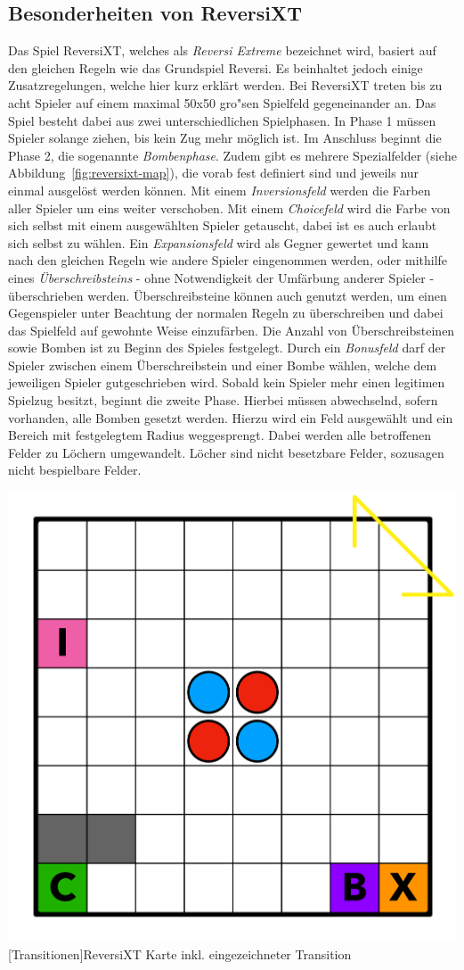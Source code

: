 \subsection{Besonderheiten von ReversiXT}\label{subsec:besonderheiten-von-reversixt}
Das Spiel ReversiXT, welches als \emph{Reversi Extreme} bezeichnet wird, basiert auf den gleichen Regeln wie das Grundspiel Reversi.
Es beinhaltet jedoch einige Zusatzregelungen, welche hier kurz erkl\"art werden.
Bei ReversiXT treten bis zu acht Spieler auf einem maximal 50x50 gro"sen Spielfeld gegeneinander an.
Das Spiel besteht dabei aus zwei unterschiedlichen Spielphasen.
In Phase 1 m\"ussen Spieler solange ziehen, bis kein Zug mehr m\"oglich ist.
Im Anschluss beginnt die Phase 2, die sogenannte \emph{Bombenphase}.
Zudem gibt es mehrere Spezialfelder (siehe Abbildung~\ref{fig:reversixt-map}), die vorab fest definiert sind und jeweils nur einmal ausgel\"ost werden k\"onnen.
Mit einem \emph{Inversionsfeld} werden die Farben aller Spieler um eins weiter verschoben.
Mit einem \emph{Choicefeld} wird die Farbe von sich selbst mit einem ausgew\"ahlten Spieler getauscht, dabei ist es auch erlaubt sich selbst zu w\"ahlen.
Ein \emph{Expansionsfeld} wird als Gegner gewertet und kann nach den gleichen Regeln wie andere Spieler eingenommen werden, oder mithilfe eines \emph{\"Uberschreibsteins} - ohne Notwendigkeit der Umf\"arbung anderer Spieler - \"uberschrieben werden.
\"Uberschreibsteine k\"onnen auch genutzt werden, um einen Gegenspieler unter Beachtung der normalen Regeln zu \"uberschreiben und dabei das Spielfeld auf gewohnte Weise einzuf\"arben.
Die Anzahl von \"Uberschreibsteinen sowie Bomben ist zu Beginn des Spieles festgelegt.
Durch ein \emph{Bonusfeld} darf der Spieler zwischen einem \"Uberschreibstein und einer Bombe w\"ahlen, welche dem jeweiligen Spieler gutgeschrieben wird.
Sobald kein Spieler mehr einen legitimen Spielzug besitzt, beginnt die zweite Phase.
Hierbei m\"ussen abwechselnd, sofern vorhanden, alle Bomben gesetzt werden.
Hierzu wird ein Feld ausgew\"ahlt und ein Bereich mit festgelegtem Radius weggesprengt.
Dabei werden alle betroffenen Felder zu L\"ochern umgewandelt.
L\"ocher sind nicht besetzbare Felder, sozusagen nicht bespielbare Felder.

\vspace{1em}
\begin{minipage}{\linewidth}
	\centering
	\includegraphics[width=0.5\linewidth]{pics/transition}
	[Transitionen]{ReversiXT Karte inkl. eingezeichneter Transition}
	\label{fig:reversixt-map}
\end{minipage}
\vspace{1em}

